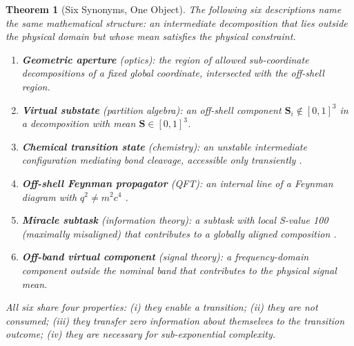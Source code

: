 \documentclass[twocolumn,10pt,a4paper]{article}
\theoremstyle{thmstyle}
\newtheorem{theorem}{Theorem}[section]
\theoremstyle{definition}
\theoremstyle{remark}
\newcommand{\Sv}{\mathbf{S}}
\begin{document}
\begin{theorem}[Six Synonyms, One Object]
\label{thm:synonyms}
The following six descriptions name the same mathematical structure:
an intermediate decomposition that lies outside the physical domain but
whose mean satisfies the physical constraint.

\begin{enumerate}[nosep,label=(\arabic*)]
\item \textbf{Geometric aperture} (optics): the region of allowed
  sub-coordinate decompositions of a fixed global coordinate, intersected
  with the off-shell region.
\item \textbf{Virtual substate} (partition algebra): an off-shell component
  $\Sv_i \notin [0,1]^3$ in a decomposition with mean $\Sv \in [0,1]^3$.
\item \textbf{Chemical transition state} (chemistry): an unstable intermediate
  configuration mediating bond cleavage, accessible only transiently
  \citep{companion:graph}.
\item \textbf{Off-shell Feynman propagator} (QFT): an internal line of a
  Feynman diagram with $q^2 \neq m^2c^4$ \citep{companion:virtual}.
\item \textbf{Miracle subtask} (information theory): a subtask with local
  S-value 100 (maximally misaligned) that contributes to a globally aligned
  composition \citep{companion:trajectory}.
\item \textbf{Off-band virtual component} (signal theory): a frequency-domain
  component outside the nominal band that contributes to the physical
  signal mean.
\end{enumerate}

All six share four properties: (i) they enable a transition;
(ii) they are not consumed; (iii) they transfer zero information about
themselves to the transition outcome; (iv) they are necessary for
sub-exponential complexity.
\end{theorem}
\end{document}
